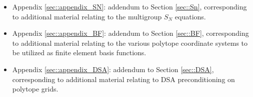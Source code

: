 \begin{itemize}
\item Appendix \ref{sec::appendix_SN}: addendum to Section \ref{sec::Sn}, corresponding to additional material relating to the multigroup $S_N$ equations.
\item Appendix \ref{sec::appendix_BF}: addendum to Section \ref{sec::BF}, corresponding to additional material relating to the various polytope coordinate systems to be utilized as finite element basis functions.
\item Appendix \ref{sec::appendix_DSA}: addendum to Section \ref{sec::DSA}, corresponding to additional material relating to DSA preconditioning on polytope grids.
\end{itemize}
